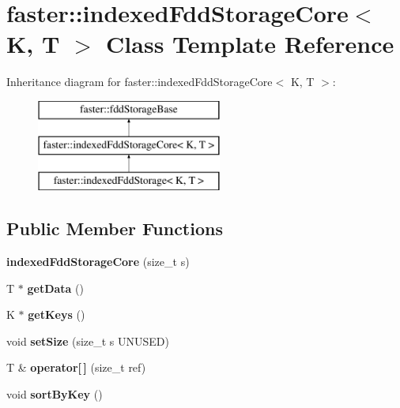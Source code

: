 \hypertarget{classfaster_1_1indexedFddStorageCore}{}\section{faster\+:\+:indexed\+Fdd\+Storage\+Core$<$ K, T $>$ Class Template Reference}
\label{classfaster_1_1indexedFddStorageCore}
Inheritance diagram for faster\+:\+:indexed\+Fdd\+Storage\+Core$<$ K, T $>$\+:\begin{figure}[H]
\begin{center}
\leavevmode
\includegraphics[height=3.000000cm]{classfaster_1_1indexedFddStorageCore}
\end{center}
\end{figure}
\subsection*{Public Member Functions}
\begin{DoxyCompactItemize}
\item 
\hypertarget{classfaster_1_1indexedFddStorageCore_a8ef8f11997d28af03b02f84a632beeea}{}{\bfseries indexed\+Fdd\+Storage\+Core} (size\+\_\+t s)\label{classfaster_1_1indexedFddStorageCore_a8ef8f11997d28af03b02f84a632beeea}

\item 
\hypertarget{classfaster_1_1indexedFddStorageCore_ace53399ba953aa365a2121cadc613d77}{}T $\ast$ {\bfseries get\+Data} ()\label{classfaster_1_1indexedFddStorageCore_ace53399ba953aa365a2121cadc613d77}

\item 
\hypertarget{classfaster_1_1indexedFddStorageCore_a8c81c09139ac2042b0d15728317dc12b}{}K $\ast$ {\bfseries get\+Keys} ()\label{classfaster_1_1indexedFddStorageCore_a8c81c09139ac2042b0d15728317dc12b}

\item 
\hypertarget{classfaster_1_1indexedFddStorageCore_a8f39ec402c0c3307ae3df58e1a172743}{}void {\bfseries set\+Size} (size\+\_\+t s U\+N\+U\+S\+E\+D)\label{classfaster_1_1indexedFddStorageCore_a8f39ec402c0c3307ae3df58e1a172743}

\item 
\hypertarget{classfaster_1_1indexedFddStorageCore_a24cb4a85df359d86a39522a4f6ff7790}{}T \& {\bfseries operator\mbox{[}$\,$\mbox{]}} (size\+\_\+t ref)\label{classfaster_1_1indexedFddStorageCore_a24cb4a85df359d86a39522a4f6ff7790}

\item 
\hypertarget{classfaster_1_1indexedFddStorageCore_a36e8a7c036dad67bde3e34925b65f68d}{}void {\bfseries sort\+By\+Key} ()\label{classfaster_1_1indexedFddStorageCore_a36e8a7c036dad67bde3e34925b65f68d}

\end{DoxyCompactItemize}
